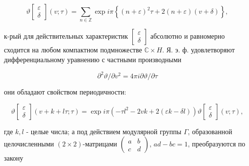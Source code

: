 \documentclass[10pt]{article}
\begin{document}
\[

\vartheta\left[\begin{array}{l}

\varepsilon \\

\delta

\end{array}\right](v ; \tau)=\sum_{n \in \mathbb{Z}} \exp i \pi\left\{(n+\varepsilon)^{2} \tau+2(n+\varepsilon)(v+\delta)\right\},

\]



к-рый для действительных характеристик $\left[\begin{array}{l}\varepsilon \\ \delta\end{array}\right]$ абсолютно и равномерно сходится на любом компактном подмножестве $\mathbb{C} \times H$. Я. э. ф. удовлетворяют дифференциальному уравнению с частными производными



\[

\partial^{2} \vartheta / \partial v^{2}=4 \pi i \partial \vartheta / \partial \tau

\]



они обладают свойством периодичности:



\[

\vartheta\left[\begin{array}{l}

\varepsilon \\

\delta

\end{array}\right](v+k+l \tau ; \tau)=\exp i \pi\left(-\tau l^{2}-2 v k+2(\varepsilon k-\delta l)\right) \vartheta\left[\begin{array}{l}

\varepsilon \\

\delta

\end{array}\right](v ; \tau),

\]



где $k, l$ - целые числа; а под действием модулярной группы $\Gamma$, образованной целочисленными $(2 \times 2)$-матрицами $\left(\begin{array}{ll}a & b \\ c & d\end{array}\right)$, $a d-b c=1$, преобразуются по закону
\end{document}
